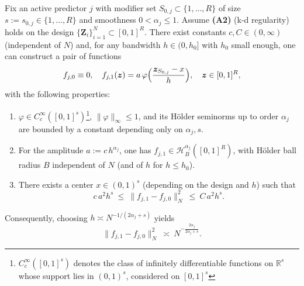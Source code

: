 \documentclass[10pt,a4paper]{amsart}
\begin{document}
\begin{lemma}\label{lem:bump}
Fix an active predictor $j$ with modifier set $S_{0,j}\subset\{1,\dots,R\}$ of size $s:=s_{0,j}\in\{1,\dots,R\}$ and smoothness $0<\alpha_j\le 1$. Assume {\textbf{(A2)}} (k-d regularity) holds on the design $\{\bm Z_i\}_{i=1}^N\subset[0,1]^R$.
There exist constants $c,C\in(0,\infty)$ (independent of $N$) and, for any bandwidth $h\in(0,h_0]$ with $h_0$ small enough, one can construct a pair of functions
\[
f_{j,0}\equiv 0,
\quad
f_{j,1}(\bm z)= a\,\varphi \Bigl(\frac{\bm z_{S_{0,j}}-x}{h}\Bigr),
\quad \bm z\in[0,1]^R,
\]
with the following properties:
\begin{enumerate}
\item[(i)] $\varphi\in C^\infty_c([0,1]^s)$\footnote{$C^{\infty}_c([0,1]^s)$ denotes the class of infinitely differentiable functions on $\mathbb{R}^s$ whose support lies in $(0,1)^s$, considered on $[0,1]^s$}, $\|\varphi\|_\infty\le 1$, and its H\"older seminorms up to order $\alpha_j$ are bounded by a constant depending only on $\alpha_j,s$.
\item[(ii)] For the amplitude $a:=c\,h^{\alpha_j}$, one has $f_{j,1}\in\mathcal H^{\alpha_j}_B([0,1]^R)$, with H\"older ball radius $B$ independent of $N$ (and of $h$ for $h\le h_0$).
\item[(iii)] There exists a center $x\in(0,1)^s$ (depending on the design and $h$) such that
\[
c\,a^2 h^{s}\ \le\ \|f_{j,1}-f_{j,0}\|_{N}^2\ \le\ C\,a^2 h^{s}.
\]
\end{enumerate}
Consequently, choosing $h\asymp N^{-1/(2\alpha_j+s)}$ yields
\[
\|f_{j,1}-f_{j,0}\|_{N}^2\ \asymp\ N^{-\frac{2\alpha_j}{2\alpha_j+s}}.
\]
\end{lemma}
\end{document}
